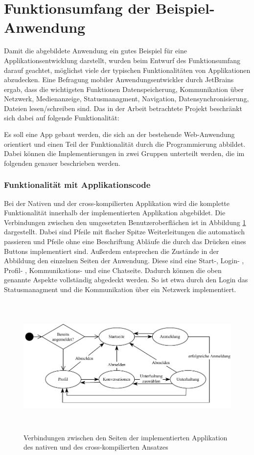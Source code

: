 \section{Funktionsumfang der Beispiel-Anwendung}
Damit die abgebildete Anwendung ein gutes Beispiel für eine Applikationsentwicklung darstellt, wurden beim Entwurf des Funktionsumfang darauf geachtet, möglichst viele der typischen Funktionalitäten von Applikationen abzudecken. Eine Befragung \cite{JetBrains_miscellaneous_2021} mobiler Anwendungsentwickler durch JetBrains ergab, dass die wichtigsten Funktionen Datenspeicherung, Kommunikation über Netzwerk, Medienanzeige, Statusmanagment, Navigation, Datensynchronisierung, Dateien lesen/schreiben sind.
Das in der Arbeit betrachtete Projekt beschränkt sich dabei auf folgende Funktionalität:

Es soll eine App gebaut werden, die sich an der bestehende Web-Anwendung orientiert und einen Teil der Funktionalität durch die Programmierung abbildet. Dabei können die Implementierungen in zwei Gruppen unterteilt werden, die im folgenden genauer beschrieben werden.

\subsubsection{Funktionalität mit Applikationscode}
Bei der Nativen und der cross-kompilierten Applikation wird die komplette Funktionalität innerhalb der implementierten Applikation abgebildet. Die Verbindungen zwischen den umgesetzten Benutzeroberflächen ist in Abbildung \ref{fig:pageflow} dargestellt. Dabei sind Pfeile mit flacher Spitze Weiterleitungen die automatisch passieren und Pfeile ohne eine Beschriftung Abläufe die durch das Drücken eines Buttons implementiert sind. Außerdem entsprechen die Zustände in der Abbildung den einzelnen Seiten der Anwendung. Diese sind eine Start-, Login- , Profil- , Kommunikations- und eine Chatseite. Dadurch können die oben genannte Aspekte vollständig abgedeckt werden. So ist etwa durch den Login das Statusmanagment und die Kommunikation über ein Netzwerk implementiert. 

\begin{figure}[ht]
  \centering
  \includegraphics[height=7cm,keepaspectratio]{images/Pageflow_native_flutter.drawio.pdf} 
  \caption[Seitenablauf der implemierten nativen und cross-kompilierten Applikation]{Verbindungen zwischen den Seiten der implementierten Applikation des nativen und des cross-kompilierten Ansatzes}
  \label{fig:pageflow}
\end{figure}

